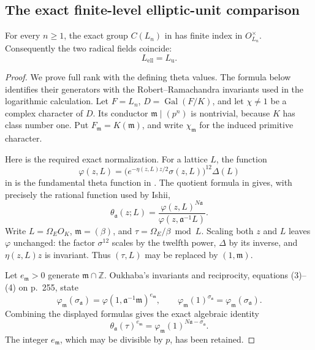 \subsection{The exact finite-level elliptic-unit comparison}
\label{subsec:cm-unit-index}

\begin{lemma}\label{lem:cm-unit-radical-comparison}
For every \(n\geq1\), the exact group \(C(L_n)\) in
\cite[Definition 2.2, p.~8]{IshiiSoule} has finite index in
\(O_{L_n}^{\times}\).
Consequently the two radical fields coincide:
\[
                         L_{\mathrm{ell}}=L_{\mathrm u}.
\]
\end{lemma}

\begin{proof}
We prove full rank with the defining theta values.
The formula below identifies their generators with the
Robert--Ramachandra invariants used in the logarithmic calculation.
Let \(F=L_n\), \(D=\operatorname{Gal}(F/K)\), and let
\(\chi\ne1\) be a complex character of \(D\).
Its conductor \(\mathfrak m\mid(p^n)\) is nontrivial, because
\(K\) has class number one.
Put \(F_{\mathfrak m}=K(\mathfrak m)\), and write
\(\chi_{\mathfrak m}\) for the induced primitive character.

Here is the required exact normalization.
For a lattice \(L\), the function
\[
 \varphi(z,L)=
       \bigl(e^{-\eta(z,L)z/2}\sigma(z,L)\bigr)^{12}\Delta(L)
\]
in \cite[(2), p.~255]{Oukhaba2009} is the fundamental theta
function in \cite[Definition 3.1(i), p.~6]{GotoIshii2026}.
The quotient formula in
\cite[Definition 3.1(ii), equation (1), p.~6]{GotoIshii2026}
gives, with precisely the rational function used by Ishii,
\[
 \theta_{\mathfrak a}(z;L)=
              \frac{\varphi(z,L)^{N\mathfrak a}}
                   {\varphi(z,\mathfrak a^{-1}L)}.
\]
Write \(L=\Omega_E O_K\), \(\mathfrak m=(\beta)\), and
\(\tau=\Omega_E/\beta\bmod L\).
Scaling both \(z\) and \(L\) leaves \(\varphi\) unchanged:
the factor \(\sigma^{12}\) scales by the twelfth power,
\(\Delta\) by its inverse, and \(\eta(z,L)z\) is invariant.
Thus \((\tau,L)\) may be replaced by \((1,\mathfrak m)\).

Let \(e_{\mathfrak m}>0\) generate
\(\mathfrak m\cap\mathbb Z\).
Oukhaba's invariants and reciprocity, equations (3)--(4) on
p.~255, state
\[
 \varphi_{\mathfrak m}(\sigma_{\mathfrak a})
      =\varphi(1,\mathfrak a^{-1}\mathfrak m)^{e_{\mathfrak m}},
 \qquad
 \varphi_{\mathfrak m}(1)^{\sigma_{\mathfrak a}}
      =\varphi_{\mathfrak m}(\sigma_{\mathfrak a}).
\]
Combining the displayed formulas gives the exact algebraic identity
\begin{equation}\label{eq:cm-exact-unit-convention}
 \theta_{\mathfrak a}(\tau)^{e_{\mathfrak m}}
       =\varphi_{\mathfrak m}(1)^{
                                  N\mathfrak a-\sigma_{\mathfrak a}}.
\end{equation}
The integer \(e_{\mathfrak m}\), which may be divisible by \(p\),
has been retained.


\end{proof}
